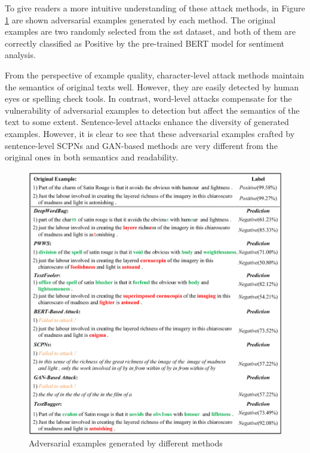 To give readers a more intuitive understanding of these attack
methods, in Figure \ref{fig:2_2_adversarial_examples} are shown adversarial examples generated by each method. 
The original examples are two randomly selected from the \acrfull{sst} dataset, and both of them are correctly classified as Positive by the pre-trained BERT model for sentiment analysis.

From the perspective of example quality, character-level attack
methods maintain the semantics of original texts well. However, they are easily detected by human eyes or spelling check tools.
In contrast, word-level attacks compensate for the vulnerability of adversarial examples to detection but affect the semantics of the text to some extent.
Sentence-level attacks enhance the diversity of generated examples. However, it is clear to see that these adversarial examples crafted by sentence-level SCPNs and GAN-based methods are very different from the original ones in both semantics and readability. 

\begin{figure}[H]
  \centering
  \includegraphics[width=0.8\linewidth]{images/2_2_adversarial_examples.png}
  \caption{Adversarial examples generated by different methods \cite{QIU2022278}}
  \label{fig:2_2_adversarial_examples}
\end{figure}

